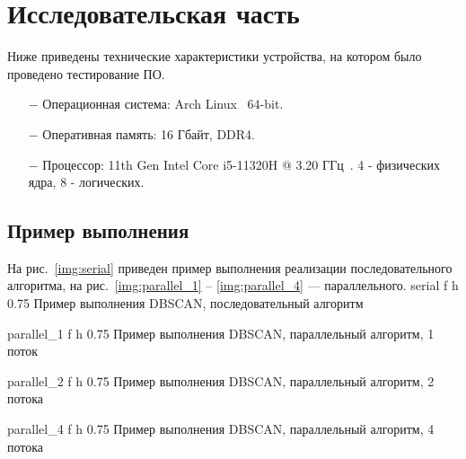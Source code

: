 \chapter{Исследовательская часть}
Ниже приведены технические характеристики устройства, на котором было проведено тестирование ПО.

\begin{itemize}
    \item[$-$] Операционная система: Arch Linux~\cite{arch} 64-bit.
    \item[$-$] Оперативная память: 16 Гбайт, DDR4.
    \item[$-$] Процессор: 11th Gen Intel\textsuperscript{\tiny\textregistered} Core\textsuperscript{\tiny\texttrademark} i5-11320H @ 3.20 ГГц~\cite{i5}. 4 - физических ядра, 8 - логических.
\end{itemize}

\section{Пример выполнения}
На рис.~\ref{img:serial} приведен пример выполнения реализации последовательного алгоритма, на рис.~\ref{img:parallel_1} -- \ref{img:parallel_4} --- параллельного.
{serial} %
{f} %
{h} %
{0.75\textwidth} %
{Пример выполнения DBSCAN, последовательный алгоритм} %

{parallel_1} %
{f} %
{h} %
{0.75\textwidth} %
{Пример выполнения DBSCAN, параллельный алгоритм, 1 поток} %

{parallel_2} %
{f} %
{h} %
{0.75\textwidth} %
{Пример выполнения DBSCAN, параллельный алгоритм, 2 потока} %


{parallel_4} %
{f} %
{h} %
{0.75\textwidth} %
{Пример выполнения DBSCAN, параллельный алгоритм, 4 потока} %

